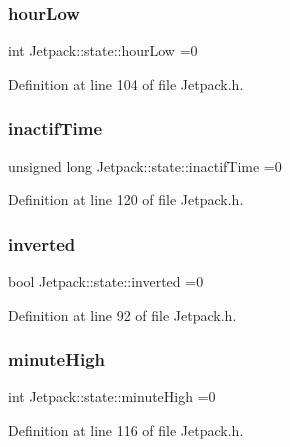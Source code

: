 \subsubsection{\texorpdfstring{hour\+Low}{hourLow}}
{\footnotesize\ttfamily int Jetpack\+::state\+::hour\+Low =0}



Definition at line 104 of file Jetpack.\+h.

\mbox{\label{struct_jetpack_1_1state_aaf817b1f9e7a4d65b9e3ca4726b281f6}} 
\subsubsection{\texorpdfstring{inactif\+Time}{inactifTime}}
{\footnotesize\ttfamily unsigned long Jetpack\+::state\+::inactif\+Time =0}



Definition at line 120 of file Jetpack.\+h.

\mbox{\label{struct_jetpack_1_1state_a6bc03bb8f05b10aa142dbb0c39c87fb5}} 
\subsubsection{\texorpdfstring{inverted}{inverted}}
{\footnotesize\ttfamily bool Jetpack\+::state\+::inverted =0}



Definition at line 92 of file Jetpack.\+h.

\mbox{\label{struct_jetpack_1_1state_a8c26c18b0ec449b7545934cb01cca028}} 
\subsubsection{\texorpdfstring{minute\+High}{minuteHigh}}
{\footnotesize\ttfamily int Jetpack\+::state\+::minute\+High =0}



Definition at line 116 of file Jetpack.\+h.

